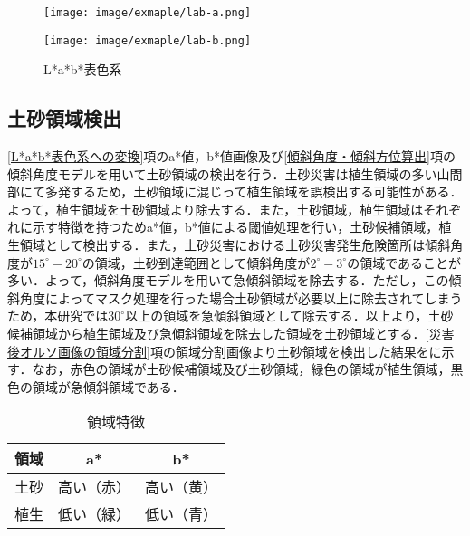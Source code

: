       \begin{figure}[tbp]
        \begin{minipage}[c]{0.5\hsize}
          \centering
          \texttt{[image: image/exmaple/lab-a.png]}
        \end{minipage}
        \begin{minipage}[c]{0.5\hsize}
          \centering
          \texttt{[image: image/exmaple/lab-b.png]}
        \end{minipage}
        \caption{L*a*b*表色系}
        \label{Lab画像}
      \end{figure}


    \subsection{土砂領域検出}
      \label{土砂領域検出}
      \ref{L*a*b*表色系への変換}項のa*値，b*値画像及び\ref{傾斜角度・傾斜方位算出}項の傾斜角度モデルを用いて土砂領域の検出を行う．土砂災害は植生領域の多い山間部にて多発するため，土砂領域に混じって植生領域を誤検出する可能性がある．よって，植生領域を土砂領域より除去する．また，土砂領域，植生領域はそれぞれに示す特徴を持つためa*値，b*値による閾値処理を行い，土砂候補領域，植生領域として検出する．また，土砂災害における土砂災害発生危険箇所は傾斜角度が$15^{\circ} - 20^{\circ}$の領域，土砂到達範囲として傾斜角度が$2^{\circ} - 3^{\circ}$の領域であることが多い\cite{土砂災害発生範囲}．よって，傾斜角度モデルを用いて急傾斜領域を除去する．ただし，この傾斜角度によってマスク処理を行った場合土砂領域が必要以上に除去されてしまうため，本研究では$30^{\circ}$以上の領域を急傾斜領域として除去する．以上より，土砂候補領域から植生領域及び急傾斜領域を除去した領域を土砂領域とする．\ref{災害後オルソ画像の領域分割}項の領域分割画像より土砂領域を検出した結果をに示す．なお，赤色の領域が土砂候補領域及び土砂領域，緑色の領域が植生領域，黒色の領域が急傾斜領域である．

      \begin{table}[tbp]
        \centering
        \caption{領域特徴}
        \label{領域特徴}
        \begin{tabular}{ccc}
          \hline
          \textbf{領域} & \textbf{a*} & \textbf{b*} \\
          \hline  \hline
          土砂 & 高い（赤） & 高い（黄） \\
          植生 & 低い（緑） & 低い（青） \\ \hline
        \end{tabular}
      \end{table}
      
